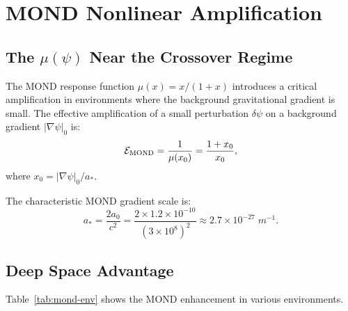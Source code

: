 \documentclass[twocolumn,prl,superscriptaddress,nofootinbib,longbibliography,floatfix]{revtex4-2}
\newcommand{\astar}{a_*}
\begin{document}
\section{MOND Nonlinear Amplification}\label{sec:mond}

\subsection{The $\mu(\psi)$ Near the Crossover Regime}

The MOND response function $\mu(x) = x/(1+x)$ introduces a critical
amplification in environments where the background gravitational
gradient is small.  The effective amplification of a small perturbation
$\delta\psi$ on a background gradient $|\nabla\psi|_0$ is:
\begin{equation}
\mathcal{E}_{\rm MOND} = \frac{1}{\mu(x_0)}
= \frac{1 + x_0}{x_0},
\label{eq:E-mond}
\end{equation}
where $x_0 = |\nabla\psi|_0/\astar$.

The characteristic MOND gradient scale is:
\begin{equation}
\astar = \frac{2a_0}{c^2} =
\frac{2 \times 1.2 \times 10^{-10}}{(3 \times 10^8)^2}
\approx 2.7 \times 10^{-27}\;\si{m^{-1}}.
\label{eq:astar-value}
\end{equation}

\subsection{Deep Space Advantage}

Table~\ref{tab:mond-env} shows the MOND enhancement in various
environments.
\end{document}
